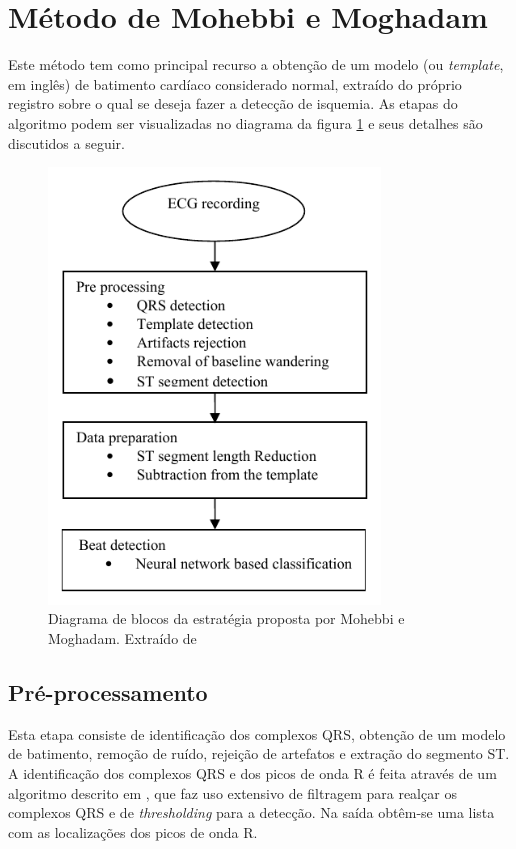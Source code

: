 \section{Método de Mohebbi e Moghadam}
\label{sec:mohebbi}
Este método tem como principal recurso a obtenção de um modelo (ou \emph{template}, em inglês) de batimento cardíaco considerado normal, extraído do próprio registro sobre o qual se deseja fazer a detecção de isquemia. As etapas do algoritmo podem ser visualizadas no diagrama da figura \ref{fig:mohebbidiag} e seus detalhes são discutidos a seguir.

\begin{figure}[ht]
    \centering
    \includegraphics[width=250pt]{figures/chap5-mohebbi-diagram.pdf}
    \caption[Diagrama de blocos da estratégia proposta por Mohebbi e Moghadam]{Diagrama de blocos da estratégia proposta por Mohebbi e Moghadam. Extraído de \cite{Mohebbi2007}}
    \label{fig:mohebbidiag}
\end{figure}

\subsection*{Pré-processamento}
Esta etapa consiste de identificação dos complexos QRS, obtenção de um modelo de batimento, remoção de ruído, rejeição de artefatos e extração do segmento ST. A identificação dos complexos QRS e dos picos de onda R é feita através de um algoritmo descrito em \cite{Tompkins1993}, que faz uso extensivo de filtragem para realçar os complexos QRS e de \emph{thresholding} para a detecção. Na saída obtêm-se uma lista com as localizações dos picos de onda R.

